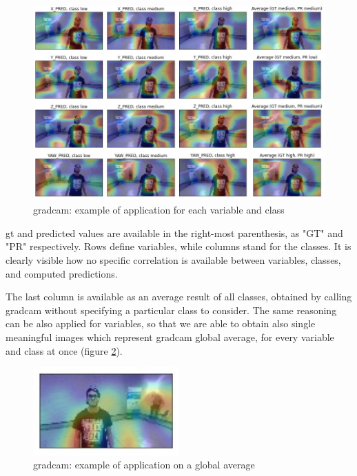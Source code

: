 \begin{figure}[!h]
	\centering
	\includegraphics[width=1\textwidth]{"contents/images/gradcam/04-gradcam-example-1"}
	\caption[\gls{gradcam}: example of application for each variable and class]{\gls{gradcam}: example of application for each variable and class}
	\label{fig:gradcam-example-1}
\end{figure}

\gls{gt} and predicted values are available in the right-most parenthesis, as "GT" and "PR" respectively. Rows define variables, while columns stand for the classes. It is clearly visible how no specific correlation is available between variables, classes, and computed predictions.

The last column is available as an average result of all classes, obtained by calling \gls{gradcam} without specifying a particular class to consider. The same reasoning can be also applied for variables, so that we are able to obtain also single meaningful images which represent \gls{gradcam} global average, for every variable and class at once (figure \ref{fig:gradcam-example-2}).

\begin{figure}[!h]
	\centering
	\includegraphics[width=0.5\textwidth]{"contents/images/gradcam/04-gradcam-example-2"}
	\caption[\gls{gradcam}: example of application on a global average]{\gls{gradcam}: example of application on a global average}
	\label{fig:gradcam-example-2}
\end{figure}



